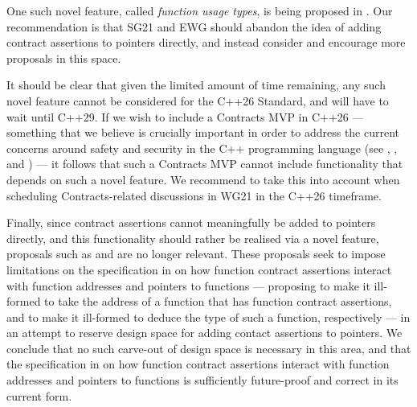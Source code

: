 One such novel feature, called \emph{function usage types}, is being proposed in \cite{P3271R0}. Our recommendation is that SG21 and EWG should abandon the idea of adding contract assertions to pointers directly, and instead consider \cite{P3271R0} and encourage more proposals in this space.

It should be clear that given the limited amount of time remaining, any such novel feature cannot be considered for the C++26 Standard, and will have to wait until C++29. If we wish to include a Contracts MVP in C++26 --- something that we believe is crucially important in order to address the current concerns around safety and security in the C++ programming language (see \cite{P3269R0}, \cite{P3276R0}, and \cite{P3297R0}) --- it follows that such a Contracts MVP cannot include functionality that depends on such a novel feature. We recommend to take this into account when scheduling Contracts-related discussions in WG21 in the C++26 timeframe.


Finally, since contract assertions cannot meaningfully be added to pointers directly, and this functionality should rather be realised via a novel feature, proposals such as \cite{P3221R0} and \cite{P3250R0} are no longer relevant. These proposals seek to impose limitations on the specification in \cite{P2900R7} on how function contract assertions interact with function addresses and pointers to functions --- proposing to make it ill-formed to take the address of a function that has function contract assertions, and to make it ill-formed to deduce the type of such a function, respectively --- in an attempt to reserve design space for adding  contact assertions to pointers. We conclude that no such carve-out of design space is necessary in this area, and that the specification in \cite{P2900R7} on how function contract assertions interact with function addresses and pointers to functions is sufficiently future-proof and correct in its current form.




